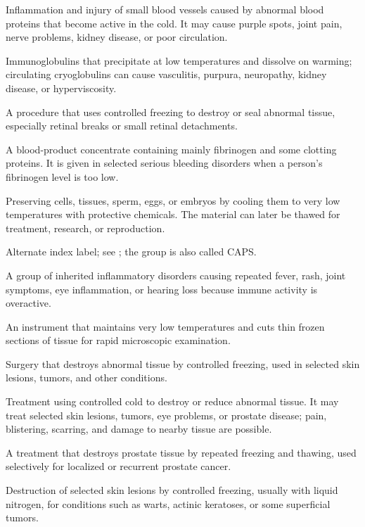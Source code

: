  Inflammation and injury of small blood vessels caused by abnormal blood proteins that become active in the cold. It may cause purple spots, joint pain, nerve problems, kidney disease, or poor circulation.

 Immunoglobulins that precipitate at low temperatures and dissolve on warming; circulating cryoglobulins can cause vasculitis, purpura, neuropathy, kidney disease, or hyperviscosity.

 A procedure that uses controlled freezing to destroy or seal abnormal tissue, especially
retinal breaks or small retinal detachments.

 A blood-product concentrate containing mainly fibrinogen and some clotting proteins. It is given in selected serious bleeding disorders when a person's fibrinogen level is too low.

 Preserving cells, tissues, sperm, eggs, or embryos by cooling them to very low temperatures with protective chemicals. The material can later be thawed for treatment, research, or reproduction.

 Alternate index label; see ; the group is also called CAPS.

 A group of inherited inflammatory disorders causing repeated fever, rash, joint symptoms, eye inflammation, or hearing loss because immune activity is overactive.

 An instrument that maintains very low temperatures and cuts thin frozen sections of tissue for rapid microscopic examination.

 Surgery that destroys abnormal tissue by controlled freezing, used in selected skin
lesions, tumors, and other conditions.

 Treatment using controlled cold to destroy or reduce abnormal tissue. It may treat selected skin lesions, tumors, eye problems, or prostate disease; pain, blistering, scarring, and damage to nearby tissue are possible.

 A treatment that destroys prostate tissue by repeated freezing and thawing, used selectively for localized or recurrent prostate cancer.

 Destruction of selected skin lesions by controlled freezing, usually with liquid nitrogen, for conditions such as warts, actinic keratoses, or some superficial tumors.

